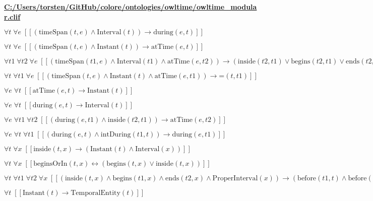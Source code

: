 \documentclass{article}
\begin{document}
\textbf{\url{C:/Users/torsten/GitHub/colore/ontologies/owltime/owltime\_modular.clif}}

$\forall t\; \forall e\;  \left[ \left[ \left(\textrm{timeSpan}(t,e) \land \textrm{Interval}(t)\right) \rightarrow \textrm{during}(e,t) \right] \right]$

$\forall t\; \forall e\;  \left[ \left[ \left(\textrm{timeSpan}(t,e) \land \textrm{Instant}(t)\right) \rightarrow \textrm{atTime}(e,t) \right] \right]$

$\forall t1\; \forall t2\; \forall e\;  \left[ \left[ \left(\textrm{timeSpan}(t1,e) \land \textrm{Interval}(t1) \land \textrm{atTime}(e,t2)\right) \rightarrow \left(\textrm{inside}(t2,t1) \lor \textrm{begins}(t2,t1) \lor \textrm{ends}(t2,t1)\right) \right] \right]$

$\forall t\; \forall t1\; \forall e\;  \left[ \left[ \left(\textrm{timeSpan}(t,e) \land \textrm{Instant}(t) \land \textrm{atTime}(e,t1)\right) \rightarrow \textrm{=}(t,t1) \right] \right]$

$\forall e\; \forall t\;  \left[ \left[ \textrm{atTime}(e,t) \rightarrow \textrm{Instant}(t) \right] \right]$

$\forall e\; \forall t\;  \left[ \left[ \textrm{during}(e,t) \rightarrow \textrm{Interval}(t) \right] \right]$

$\forall e\; \forall t1\; \forall t2\;  \left[ \left[ \left(\textrm{during}(e,t1) \land \textrm{inside}(t2,t1)\right) \rightarrow \textrm{atTime}(e,t2) \right] \right]$

$\forall e\; \forall t\; \forall t1\;  \left[ \left[ \left(\textrm{during}(e,t) \land \textrm{intDuring}(t1,t)\right) \rightarrow \textrm{during}(e,t1) \right] \right]$

$\forall t\; \forall x\;  \left[ \left[ \textrm{inside}(t,x) \rightarrow \left(\textrm{Instant}(t) \land \textrm{Interval}(x)\right) \right] \right]$

$\forall t\; \forall x\;  \left[ \left[ \textrm{beginsOrIn}(t,x) \leftrightarrow \left(\textrm{begins}(t,x) \lor \textrm{inside}(t,x)\right) \right] \right]$

$\forall t\; \forall t1\; \forall t2\; \forall x\;  \left[ \left[ \left(\textrm{inside}(t,x) \land \textrm{begins}(t1,x) \land \textrm{ends}(t2,x) \land \textrm{ProperInterval}(x)\right) \rightarrow \left(\textrm{before}(t1,t) \land \textrm{before}(t,t2)\right) \right] \right]$

$\forall t\;  \left[ \left[ \textrm{Instant}(t) \rightarrow \textrm{TemporalEntity}(t) \right] \right]$
\end{document}
